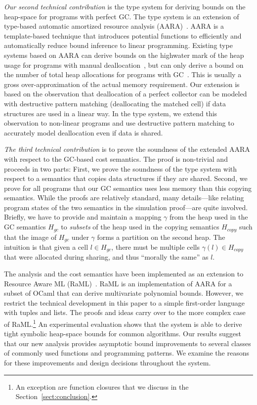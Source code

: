 \documentclass{easychair}
\theoremstyle{definition}
\begin{document}
\emph{Our second technical contribution} is the type system for
deriving bounds on the heap-space for programs with perfect GC. The
type system is an extension of type-based automatic amortized resource
analysis
(AARA)~\cite{Jost03,Jost10,VasconcelosJFH15,HoffmannAH10,HoffmannW15,NgoDFH16}. AARA
is a template-based technique that introduces potential functions to
efficiently and automatically reduce bound inference to linear
programming. Existing type systems based on AARA can derive bounds on
the highwater mark of the heap usage for programs with manual
deallocation~\cite{Jost10}, but can only derive a bound on the
number of total heap allocations for programs with
GC~\cite{HoffmannW15}. This is usually a gross over-approximation of
the actual memory requirement. Our extension is based on the
observation that deallocation of a perfect collector can be modeled
with destructive pattern matching (deallocating the matched cell) if
data structures are used in a linear way. In the type system, we
extend this observation to non-linear programs and use destructive
pattern matching to accurately model deallocation even if data is
shared.

\emph{The third technical contribution} is to prove the soundness of
the extended AARA with respect to the GC-based cost semantics. The
proof is non-trivial and proceeds in two parts: First, we prove the
soundness of the type system with respect to a semantics that copies
data structures if they are shared. Second, we prove for all programs
that our GC semantics uses less memory than this copying
semantics. While the proofs are relatively standard, many
details---like relating program states of the two semantics in the
simulation proof---are quite involved. Briefly, we have to provide and maintain 
a mapping $\gamma$ from the heap used in the GC semantics $H_{gc}$ to \emph{subsets} of
the heap used in the copying semantics $H_{copy}$ such that the image of 
$H_{gc}$ under $\gamma$ forms a partition on the second heap. The intuition is that 
given a cell $l \in H_{gc}$, there must be multiple cells $\gamma(l) \in H_{copy}$  
that were allocated during sharing, and thus ``morally the same'' as $l$.

The analysis and the cost semantics have been implemented as an
extension to Resource Aware ML (RaML)~\cite{HoffmannAH10,HoffmannW15}. RaML is an
implementation of AARA for a subset of OCaml that can derive
multivariate polynomial bounds. However, we restrict the technical
development in this paper to a simple first-order language with
tuples and lists. The proofs and ideas carry over to the more
complex case of RaML.\footnote{An exception are function closures that
  we discuss in the Section~\ref{sect:conclusion}.}
%
An experimental evaluation shows that the system is able to derive
tight symbolic heap-space bounds for common algorithms. Our results
suggest that our new analysis provides asymptotic bound improvements
to several classes of commonly used functions and programming
patterns. We examine the reasons for these improvements and design
decisions throughout the system.
\end{document}
